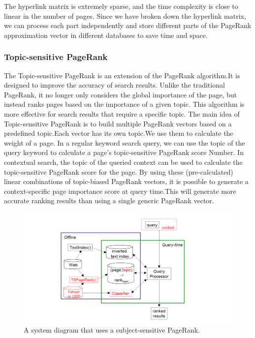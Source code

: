 \documentclass[lettersize,journal,12pt]{IEEEtran}
\begin{document}
The hyperlink matrix is extremely sparse, and the time complexity is close to linear in the number of pages. Since we have broken down the hyperlink matrix, we can process each part independently and store different parts of the PageRank approximation vector in different databases to save time and space.



\subsubsection{ Topic-sensitive PageRank}

The Topic-sensitive PageRank is an extension of the PageRank algorithm.It is designed to improve the accuracy of search results. Unlike the traditional PageRank, it no longer only considers the global importance of the page, but instead ranks pages based on the importance of a given topic. This algorithm is more effective for search results that require a specific topic.
The main idea of Topic-sensitive PageRank is to build multiple PageRank vectors based on a predefined topic.Each vector has its own topic.We use them to calculate the weight of a page. In a regular keyword search query, we can use the topic of the query keyword to calculate a page's topic-sensitive PageRank score Number. In contextual search, the topic of the queried context can be used to calculate the topic-sensitive PageRank score for the page. By using these (pre-calculated) linear combinations of topic-biased PageRank vectors, it is possible to generate a context-specific page importance score at query time.This will generate more accurate ranking results than using a single generic PageRank vector.
\begin{figure}[!t]
	\centering
	\includegraphics[width=\textwidth]{images/fig3.png}
	\caption{A system diagram that uses a subject-sensitive PageRank.}
	\label{fig3}
\end{figure}
\end{document}
